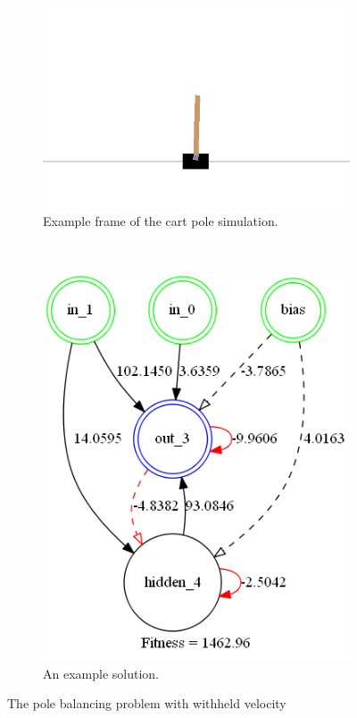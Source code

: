 \documentclass[twocolumn,letterpaper]{article}
\begin{document}
\begin{figure}[h]
	\centering
	\begin{subfigure}[b]{0.3\textwidth}
		\includegraphics[width=\textwidth]{images/pole_balance.png}
		\caption{Example frame of the cart pole simulation.}
	\end{subfigure}
	~
	\begin{subfigure}[b]{0.3\textwidth}
		\includegraphics[width=\textwidth]{images/cart_pole_final.png}
		\caption{An example solution.}
		\label{fig:cart_solution}
	\end{subfigure}
	\caption{The pole balancing problem with withheld velocity}
	\label{fig:cartpole}
\end{figure}
\end{document}
